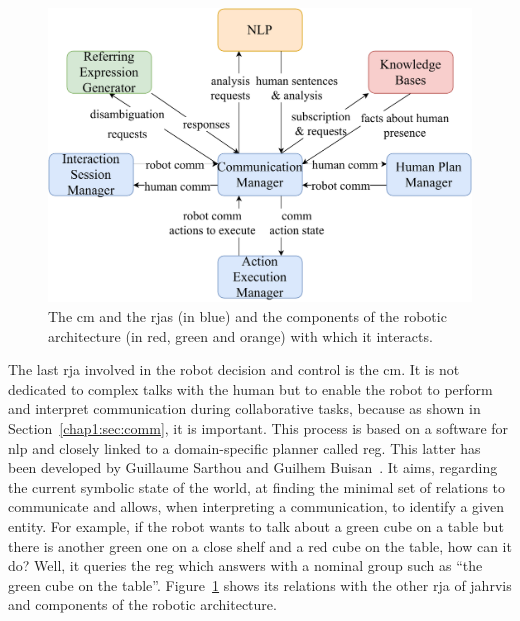 \documentclass[a4paper,11pt,twoside]{StyleThese}
\begin{document}
\begin{figure}[!hbt]
	\centering
	\includegraphics[width=0.85\linewidth]{figures/chapter2/comm_manager_zoom.pdf}
	\caption{The \acrlong{cm} and the \acrshort{rja}s (in blue) and the components of the robotic architecture (in red, green and orange) with which it interacts.}
	\label{chap6:fig:comm_manager_zoom}
\end{figure}

The last \acrshort{rja} involved in the robot decision and control is the \acrfull{cm}. It is not dedicated to complex talks with the human but to enable the robot to perform and interpret communication during collaborative tasks, because as shown in Section~\ref{chap1:sec:comm}, it is important. This process is based on a software for \acrfull{nlp} and closely linked to a domain-specific planner called \acrfull{reg}. This latter has been developed by Guillaume Sarthou and Guilhem Buisan~\citep{buisan_2020_efficient, sarthou_2021_extending}. It aims, regarding the current symbolic state of the world, at finding the minimal set of relations to communicate and allows, when interpreting a communication, to identify a given entity. For example, if the robot wants to talk about a green cube on a table but there is another green one on a close shelf and a red cube on the table, how can it do? Well, it queries the \acrshort{reg} which answers with a nominal group such as ``the green cube on the table''. Figure~\ref{chap6:fig:comm_manager_zoom} shows its relations with the other \acrshort{rja} of \acrshort{jahrvis} and components of the robotic architecture.
\end{document}

